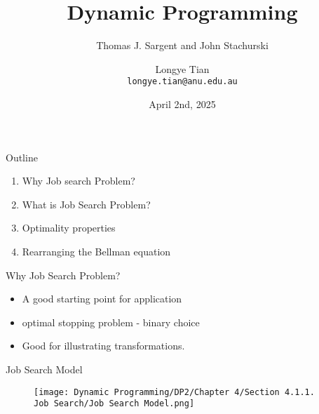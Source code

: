 \documentclass[aspectratio=169]{beamer} %
\title[DP2]{Dynamic Programming}
\subtitle{Thomas J. Sargent and John Stachurski}
\author[Longye]{Longye Tian \\ \texttt{longye.tian@anu.edu.au}}
\institute[ANU]{Australian National University\\ School of Economics}
\date{April 2nd, 2025}
\begin{document}
\begin{frame}
  \titlepage
\end{frame}

\begin{frame}{Outline}
  \begin{enumerate}
      \item Why Job search Problem?
      \item What is Job Search Problem?
      \item Optimality properties
      \item Rearranging the Bellman equation
  \end{enumerate}
\end{frame}

\begin{frame}{Why Job Search Problem?}
    \begin{itemize}
        \item A good starting point for application 
        \item optimal stopping problem - binary choice
        \item Good for illustrating transformations.
    \end{itemize}
\end{frame}


\begin{frame}{Job Search Model}
    \begin{figure}
        \centering
        \texttt{[image: Dynamic Programming/DP2/Chapter 4/Section 4.1.1. Job Search/Job Search Model.png]}
    \end{figure}
\end{frame}
\end{document}
